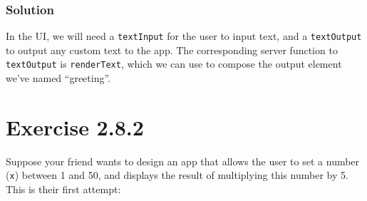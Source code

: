 \documentclass[]{book}
\newenvironment{Shaded}{\begin{snugshade}}{\end{snugshade}}
\newcommand{\ControlFlowTok}[1]{\textcolor[rgb]{0.13,0.29,0.53}{\textbf{#1}}}
\newcommand{\KeywordTok}[1]{\textcolor[rgb]{0.13,0.29,0.53}{\textbf{#1}}}
\newcommand{\NormalTok}[1]{#1}
\newcommand{\OperatorTok}[1]{\textcolor[rgb]{0.81,0.36,0.00}{\textbf{#1}}}
\newcommand{\StringTok}[1]{\textcolor[rgb]{0.31,0.60,0.02}{#1}}
\begin{document}
\begin{solution}

\hypertarget{solution}{%
\subsubsection*{Solution}\label{solution}}

In the UI, we will need a \texttt{textInput} for the user to input text, and
a \texttt{textOutput} to output any custom text to the app. The corresponding server
function to \texttt{textOutput} is \texttt{renderText}, which we can use to compose the
output element we've named ``greeting''.

\begin{Shaded}
\end{Shaded}

\end{solution}

\hypertarget{exercise-2.8.2}{%
\section*{Exercise 2.8.2}\label{exercise-2.8.2}}

Suppose your friend wants to design an app that allows the user to set a number
(\texttt{x}) between 1 and 50, and displays the result of multiplying this number by
5. This is their first attempt:
\end{document}
